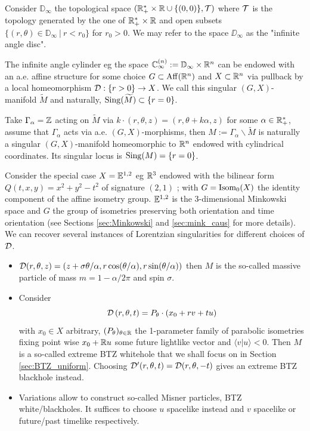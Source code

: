 \begin{ex}\label{ex:quotient_base}
 Consider $\mathbb D_{\infty}$ the topological space $(\mathbb R_{+}^*\times \mathbb R \cup \{(0,0)\},\mathcal{T})$ where $\mathcal{T}$ is the topology generated by the one of $\mathbb R_+^*\times \mathbb R$  and open subsets $\{(r,\theta) \in \mathbb D_{\infty} ~|~ r<r_0\}$ for $r_0>0$. We may refer to the space $\DD_\infty$ as  the "infinite angle disc".
 
 The infinite angle cylinder eg  the space $\mathbb{C}_\infty^{(n)} :=\mathbb{D}_\infty \times \mathbb R^n$  can be endowed with an a.e. affine structure for some choice $G\subset \mathrm{Aff}(\mathbb R^n)$ and $X\subset \mathbb R^n$   via pullback by a local homeomorphism $\mathcal{D} : \{r>0\}\rightarrow X$. We call this singular $(G,X)$-manifold $\widetilde M$ and  naturally, $\mathrm{Sing}(\widetilde M)\subset \{r=0\}$.
 
 Take $\Gamma_\alpha =\mathbb Z$ acting on $\widetilde M$ via $k\cdot (r,\theta,z)= (r,\theta+k\alpha,z)$ for some $\alpha\in \mathbb R_+^*$, assume that $\Gamma_\alpha$ acts via a.e. $(G,X)$-morphisms, then $M:=\Gamma_\alpha\backslash \widetilde M$ is naturally a singular $(G,X)$-manifold homeomorphic to $\mathbb R^n$ endowed with cylindrical coordinates.  Its singular locus is $\mathrm{Sing}(M) = \{r=0\}$.
 
 Consider the special case $X={\mathbb E}^{1,2}_{}$ eg $\mathbb R^3$ endowed  with the bilinear form $Q(t,x,y)=x^2+y^2-t^2$ of signature $(2,1)$ ; with $G = \mathrm{Isom}_0(X)$ the identity component of the affine isometry group.  ${\mathbb E}^{1,2}_{}$ is the 3-dimensional Minkowski space and $G$ the group of isometries preserving both orientation and time orientation (see Sections \ref{sec:Minkowski} and \ref{sec:mink_caus} for more details). We can recover several instances of Lorentzian singularities \cite{Particules_1,barbot2012particles} for different choices of $\mathcal{D}$. 
 \begin{itemize}
  \item   $\mathcal{D}(r,\theta,z) = (z+\sigma\theta/\alpha, r\cos(\theta/\alpha),r\sin(\theta/\alpha))$ then $M$ is the so-called massive particle of mass $m=1-\alpha/2\pi$ and spin $\sigma$.
  \item  Consider $$\mathcal{D}\left(r,\theta,t\right)= 
P_\theta\cdot (x_0+rv + t u)
$$
with $x_0\in X$ arbitrary,  $(P_\theta)_{\theta\in \mathbb R}$ the 1-parameter family of parabolic isometries fixing point wise $x_0+\mathbb R u$ some future lightlike vector and $\langle v|u\rangle<0$.  
Then $M$ is a so-called extreme BTZ whitehole that we shall focus on in Section \ref{sec:BTZ_uniform}. Choosing $\mathcal{D}'(r,\theta,t) = \mathcal{D}(r,\theta,-t)$ gives an extreme BTZ blackhole instead.
\item Variations allow to construct so-called Misner particles, BTZ white/blackholes. It suffices to choose  $u$ spacelike instead and $v$ spacelike or future/past timelike  respectively.


\end{itemize}
\end{ex}
